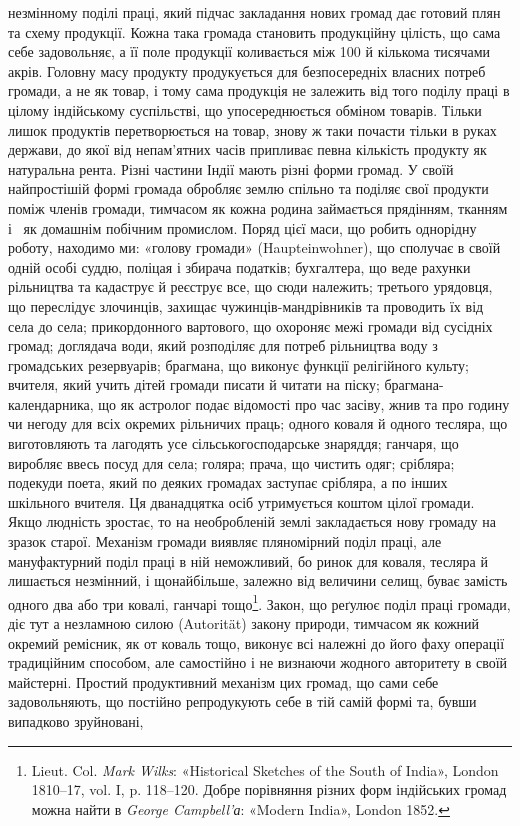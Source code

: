 \parcont{}  %
незмінному поділі праці, який підчас закладання нових громад
дає готовий плян та схему продукції. Кожна така громада становить
продукційну цілість, що сама себе задовольняє, а її поле
продукції коливається між 100 й кількома тисячами акрів. Головну
масу продукту продукується для безпосередніх власних
потреб громади, а не як товар, і тому сама продукція не залежить
від того поділу праці в цілому індійському суспільстві, що упосереднюється
обміном товарів. Тільки лишок продуктів перетворюється
на товар, знову ж таки почасти тільки в руках держави,
до якої від непам’ятних часів припливає певна кількість продукту
як натуральна рента. Різні частини Індії мають різні
форми громад. У своїй найпростішій формі громада обробляє
землю спільно та поділяє свої продукти поміж членів громади,
тимчасом як кожна родина займається прядінням, тканням і~
як домашнім побічним промислом. Поряд цієї маси, що робить
однорідну роботу, находимо ми: «голову громади» (Haupteinwohner),
що сполучає в своїй одній особі суддю, поліцая і збирача
податків; бухгалтера, що веде рахунки рільництва та кадаструє
й реєструє все, що сюди належить; третього урядовця, що переслідує
злочинців, захищає чужинців-мандрівників та проводить
їх від села до села; прикордонного вартового, що охороняє межі
громади від сусідніх громад; доглядача води, який розподіляє
для потреб рільництва воду з громадських резервуарів; брагмана,
що виконує функції релігійного культу; вчителя, який учить
дітей громади писати й читати на піску; брагмана-календарника,
що як астролог подає відомості про час засіву, жнив та про годину
чи негоду для всіх окремих рільничих праць; одного коваля й
одного тесляра, що виготовляють та лагодять усе сільськогосподарське
знаряддя; ганчаря, що виробляє ввесь посуд для
села; голяра; прача, що чистить одяг; срібляра; подекуди поета,
який по деяких громадах заступає срібляра, а по інших шкільного
вчителя. Ця дванадцятка осіб утримується коштом цілої
громади. Якщо людність зростає, то на необробленій землі закладається
нову громаду на зразок старої. Механізм громади виявляє
пляномірний поділ праці, але мануфактурний поділ праці в ній
неможливий, бо ринок для коваля, тесляра й~ лишається незмінний,
і щонайбільше, залежно від величини селищ, буває
замість одного два або три ковалі, ганчарі тощо\footnote{
Lieut. Col. \emph{Mark Wilks}: «Historical Sketches of the South
of India», London 1810--17, vol. I, p. 118--120. Добре порівняння
різних форм індійських громад можна найти в \emph{George Campbell’а}:
«Modern India», London 1852.
}. Закон, що
реґулює поділ праці громади, діє тут а незламною силою (Autorität)
закону природи, тимчасом як кожний окремий ремісник,
як от коваль тощо, виконує всі належні до його фаху операції
традиційним способом, але самостійно і не визнаючи жодного
авторитету в своїй майстерні. Простий продуктивний механізм
цих громад, що сами себе задовольняють, що постійно репродукують
себе в тій самій формі та, бувши випадково зруйновані,
\parbreak{}  %
